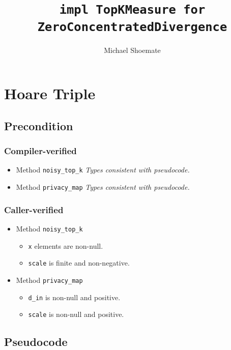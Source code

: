 \documentclass{article}
\title{\texttt{impl TopKMeasure for ZeroConcentratedDivergence}}
\author{Michael Shoemate}
\begin{document}
\maketitle

\section{Hoare Triple}
\subsection*{Precondition}
\subsubsection*{Compiler-verified}
\begin{itemize}
    \item Method \texttt{noisy\_top\_k}
        \textit{Types consistent with pseudocode.}
    \item Method \texttt{privacy\_map}
        \textit{Types consistent with pseudocode.}
\end{itemize}

\subsubsection*{Caller-verified}
\begin{itemize}
    \item Method \texttt{noisy\_top\_k}
        \begin{itemize}
            \item \texttt{x} elements are non-null.
            \item \texttt{scale} is finite and non-negative.
        \end{itemize}
    \item Method \texttt{privacy\_map}
        \begin{itemize}
            \item \texttt{d\_in} is non-null and positive.
            \item \texttt{scale} is non-null and positive.
        \end{itemize}
\end{itemize}

\subsection*{Pseudocode}
\label{sec:python-pseudocode}

\end{document}
